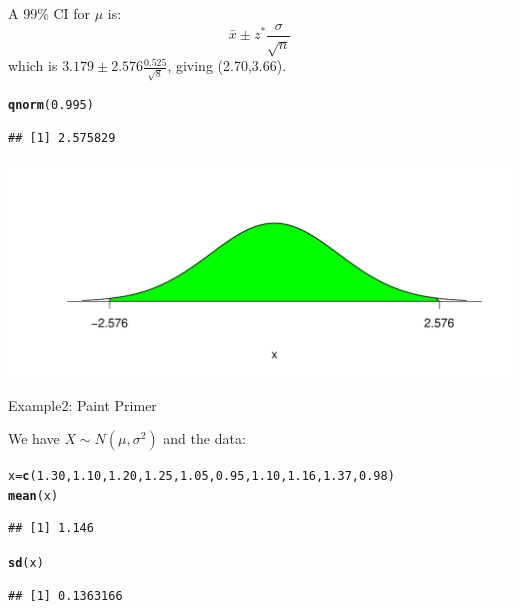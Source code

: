 \documentclass[t,xcolor=pdftex,dvipsnames,table]{beamer}
\makeatletter
\def\maxwidth{ %
  \ifdim\Gin@nat@width>\linewidth
    \linewidth
  \else
    \Gin@nat@width
  \fi
}
\newcommand{\hlnum}[1]{\textcolor[rgb]{0.686,0.059,0.569}{#1}}%
\newcommand{\hlstd}[1]{\textcolor[rgb]{0.345,0.345,0.345}{#1}}%
\newcommand{\hlkwb}[1]{\textcolor[rgb]{0.69,0.353,0.396}{#1}}%
\newcommand{\hlkwd}[1]{\textcolor[rgb]{0.737,0.353,0.396}{\textbf{#1}}}%
\newenvironment{kframe}{%
 \def\at@end@of@kframe{}%
 \ifinner\ifhmode%
  \def\at@end@of@kframe{\end{minipage}}%
  \begin{minipage}{\columnwidth}%
 \fi\fi%
 \def\FrameCommand##1{\hskip\@totalleftmargin \hskip-\fboxsep
 \colorbox{shadecolor}{##1}\hskip-\fboxsep
     \hskip-\linewidth \hskip-\@totalleftmargin \hskip\columnwidth}%
 \MakeFramed {\advance\hsize-\width
   \@totalleftmargin\z@ \linewidth\hsize
   \@setminipage}}%
 {\par\unskip\endMakeFramed%
 \at@end@of@kframe}
\newenvironment{knitrout}{}{} %
\makeatother
\begin{document}
\begin{frame}[fragile]{}

A 99\% CI for $\mu$ is: 
\[ \bar{x}  \pm z^{*} \frac{\sigma}{\sqrt{n}} \]
which is $3.179  \pm 2.576 \frac{0.525}{\sqrt{8}}$, giving (2.70,3.66).

\begin{knitrout}
\color{fgcolor}\begin{kframe}
\begin{alltt}
\hlkwd{qnorm}\hlstd{(}\hlnum{0.995}\hlstd{)}
\end{alltt}
\begin{verbatim}
## [1] 2.575829
\end{verbatim}
\end{kframe}
\end{knitrout}

\begin{knitrout}
\color{fgcolor}
\includegraphics[width=\maxwidth]{figure/unnamed-chunk-10-1} 

\end{knitrout}
\end{frame}



\begin{frame}[fragile]{Example2: Paint Primer}

We have $X \sim N(\mu,\sigma^2)$ and the data:

\begin{knitrout}
\color{fgcolor}\begin{kframe}
\begin{alltt}
\hlstd{x}\hlkwb{=}\hlkwd{c}\hlstd{(}\hlnum{1.30}\hlstd{,}\hlnum{1.10}\hlstd{,}\hlnum{1.20}\hlstd{,}\hlnum{1.25}\hlstd{,}\hlnum{1.05}\hlstd{,}\hlnum{0.95}\hlstd{,}\hlnum{1.10}\hlstd{,}\hlnum{1.16}\hlstd{,}\hlnum{1.37}\hlstd{,}\hlnum{0.98}\hlstd{)}
\hlkwd{mean}\hlstd{(x)}
\end{alltt}
\begin{verbatim}
## [1] 1.146
\end{verbatim}
\begin{alltt}
\hlkwd{sd}\hlstd{(x)}
\end{alltt}
\begin{verbatim}
## [1] 0.1363166
\end{verbatim}
\end{kframe}
\end{knitrout}
\end{frame}
\end{document}
